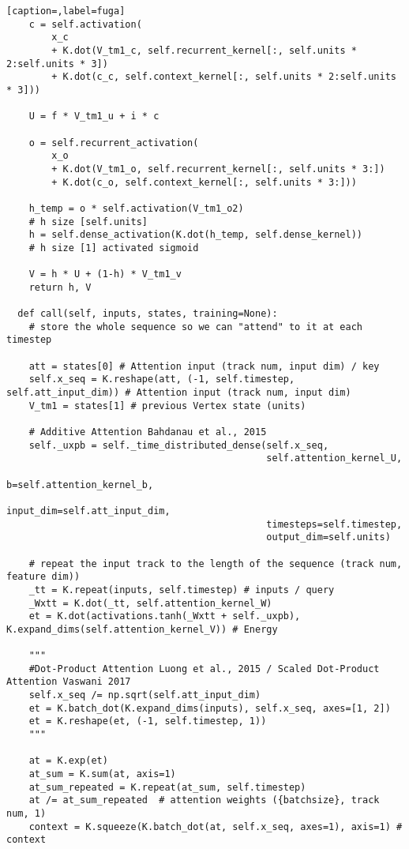 \begin{lstlisting}[caption=,label=fuga]
    c = self.activation(
        x_c
        + K.dot(V_tm1_c, self.recurrent_kernel[:, self.units * 2:self.units * 3])
        + K.dot(c_c, self.context_kernel[:, self.units * 2:self.units * 3]))

    U = f * V_tm1_u + i * c

    o = self.recurrent_activation(
        x_o
        + K.dot(V_tm1_o, self.recurrent_kernel[:, self.units * 3:])
        + K.dot(c_o, self.context_kernel[:, self.units * 3:]))

    h_temp = o * self.activation(V_tm1_o2)
    # h size [self.units]
    h = self.dense_activation(K.dot(h_temp, self.dense_kernel))
    # h size [1] activated sigmoid

    V = h * U + (1-h) * V_tm1_v
    return h, V

  def call(self, inputs, states, training=None):
    # store the whole sequence so we can "attend" to it at each timestep

    att = states[0] # Attention input (track num, input dim) / key
    self.x_seq = K.reshape(att, (-1, self.timestep, self.att_input_dim)) # Attention input (track num, input dim)
    V_tm1 = states[1] # previous Vertex state (units)

    # Additive Attention Bahdanau et al., 2015
    self._uxpb = self._time_distributed_dense(self.x_seq,
                                              self.attention_kernel_U,
                                              b=self.attention_kernel_b,
                                              input_dim=self.att_input_dim,
                                              timesteps=self.timestep,
                                              output_dim=self.units)

    # repeat the input track to the length of the sequence (track num, feature dim))
    _tt = K.repeat(inputs, self.timestep) # inputs / query
    _Wxtt = K.dot(_tt, self.attention_kernel_W)
    et = K.dot(activations.tanh(_Wxtt + self._uxpb), K.expand_dims(self.attention_kernel_V)) # Energy

    """
    #Dot-Product Attention Luong et al., 2015 / Scaled Dot-Product Attention Vaswani 2017
    self.x_seq /= np.sqrt(self.att_input_dim)
    et = K.batch_dot(K.expand_dims(inputs), self.x_seq, axes=[1, 2])
    et = K.reshape(et, (-1, self.timestep, 1))
    """

    at = K.exp(et)
    at_sum = K.sum(at, axis=1)
    at_sum_repeated = K.repeat(at_sum, self.timestep)
    at /= at_sum_repeated  # attention weights ({batchsize}, track num, 1)
    context = K.squeeze(K.batch_dot(at, self.x_seq, axes=1), axis=1) # context



\end{lstlisting}
